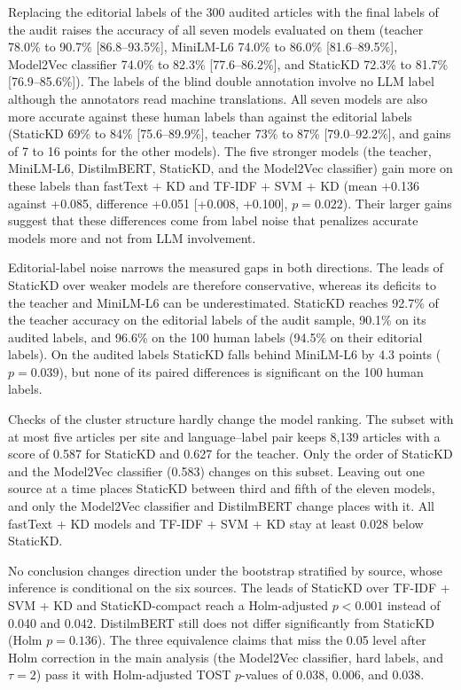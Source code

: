 \documentclass{ieeeaccess}
\begin{document}
Replacing the editorial labels of the 300 audited articles with the final labels of the audit raises the accuracy of all seven models evaluated on them (teacher 78.0\% to 90.7\% [86.8--93.5\%], MiniLM-L6 74.0\% to 86.0\% [81.6--89.5\%], Model2Vec classifier 74.0\% to 82.3\% [77.6--86.2\%], and StaticKD 72.3\% to 81.7\% [76.9--85.6\%]). The labels of the blind double annotation involve no LLM label although the annotators read machine translations. All seven models are also more accurate against these human labels than against the editorial labels (StaticKD 69\% to 84\% [75.6--89.9\%], teacher 73\% to 87\% [79.0--92.2\%], and gains of 7 to 16 points for the other models). The five stronger models (the teacher, MiniLM-L6, DistilmBERT, StaticKD, and the Model2Vec classifier) gain more on these labels than fastText + KD and TF-IDF + SVM + KD (mean +0.136 against +0.085, difference +0.051 [+0.008, +0.100], $p=0.022$). Their larger gains suggest that these differences come from label noise that penalizes accurate models more and not from LLM involvement.

Editorial-label noise narrows the measured gaps in both directions. The leads of StaticKD over weaker models are therefore conservative, whereas its deficits to the teacher and MiniLM-L6 can be underestimated. StaticKD reaches 92.7\% of the teacher accuracy on the editorial labels of the audit sample, 90.1\% on its audited labels, and 96.6\% on the 100 human labels (94.5\% on their editorial labels). On the audited labels StaticKD falls behind MiniLM-L6 by 4.3 points ($p=0.039$), but none of its paired differences is significant on the 100 human labels.

Checks of the cluster structure hardly change the model ranking. The subset with at most five articles per site and language--label pair keeps 8,139 articles with a score of 0.587 for StaticKD and 0.627 for the teacher. Only the order of StaticKD and the Model2Vec classifier (0.583) changes on this subset. Leaving out one source at a time places StaticKD between third and fifth of the eleven models, and only the Model2Vec classifier and DistilmBERT change places with it. All fastText + KD models and TF-IDF + SVM + KD stay at least 0.028 below StaticKD.

No conclusion changes direction under the bootstrap stratified by source, whose inference is conditional on the six sources. The leads of StaticKD over TF-IDF + SVM + KD and StaticKD-compact reach a Holm-adjusted $p<0.001$ instead of 0.040 and 0.042. DistilmBERT still does not differ significantly from StaticKD (Holm $p=0.136$). The three equivalence claims that miss the 0.05 level after Holm correction in the main analysis (the Model2Vec classifier, hard labels, and $\tau=2$) pass it with Holm-adjusted TOST $p$-values of 0.038, 0.006, and 0.038.
\end{document}

